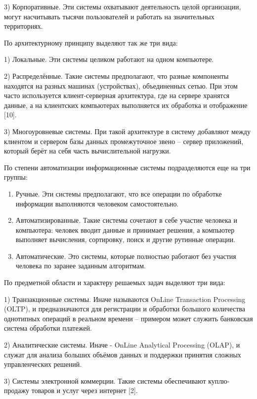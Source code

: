 \documentclass[14pt,a4paper]{extarticle}
\begin{document}
3) Корпоративные. Эти системы охватывают деятельность целой организации,
могут насчитывать тысячи пользователей и работать на значительных
территориях.

По архитектурному принципу выделяют так же три вида:

1) Локальные. Эти системы целиком работают на одном компьютере.

2) Распределённые. Такие системы предполагают, что разные компоненты
находятся на разных машинах (устройствах), объединенных сетью. При этом
часто используется клиент-серверная архитектура, где на сервере хранятся
данные, а на клиентских компьютерах выполняется их обработка и
отображение [10].

3) Многоуровневые системы. При такой архитектуре в систему добавляют
между клиентом и сервером базы данных промежуточное звено -- сервер
приложений, который берёт на себя часть вычислительной нагрузки.

По степени автоматизации информационные системы подразделяются еще на
три группы:

\begin{enumerate}
\def\labelenumi{\arabic{enumi})}
\item
  Ручные. Эти системы предполагают, что все операции по обработке
  информации выполняются человеком самостоятельно.
\item
  Автоматизированные. Такие системы сочетают в себе участие человека и
  компьютера: человек вводит данные и принимает решения, а компьютер
  выполняет вычисления, сортировку, поиск и другие рутинные операции.
\item
  Автоматические. Это системы, которые полностью работают без участия
  человека по заранее заданным алгоритмам.
\end{enumerate}

По предметной области и характеру решаемых задач выделяют три вида:

1) Транзакционные системы. Иначе называются OnLine Transaction
Processing (OLTP), и предназначаются для регистрации и обработки
большого количества однотипных операций в реальном времени -- примером
может служить банковская система обработки платежей.

2) Аналитические системы. Иначе - OnLine Analytical Processing (OLAP), и
служат для анализа больших объёмов данных и поддержки принятия сложных
управленческих решений.

3) Системы электронной коммерции. Такие системы обеспечивают
куплю-продажу товаров и услуг через интернет [2].
\end{document}
